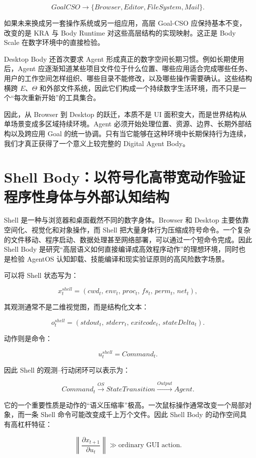 $$
GoalCSO
\rightarrow
\{
Browser,
Editor,
FileSystem,
Mail
\}.
$$

如果未来换成另一套操作系统或另一组应用，高层 Goal-CSO 应保持基本不变，改变的是 KRA 与 Body Runtime 对这些高层结构的实现映射。这正是 Body Scale 在数字环境中的直接检验。

Desktop Body 还首次要求 Agent 形成真正的数字空间长期习惯。例如长期使用后，Agent 应逐渐知道某些项目文件位于什么位置、哪些应用适合完成哪些任务、用户的工作空间怎样组织、哪些目录不能修改，以及哪些操作需要确认。这些结构横跨 $E$、$\Theta$ 和外部文件系统，因此它们构成一个持续数字生活环境，而不只是一个“每次重新开始”的工具集合。

因此，从 Browser 到 Desktop 的跃迁，本质不是 UI 面积变大，而是世界结构从单场景变成多区域持续环境。Agent 必须开始处理位置、资源、边界、长期外部结构以及跨应用 Goal 的统一协调。只有当它能够在这种环境中长期保持行为连续，我们才真正获得了一个意义上较完整的 Digital Agent Body。

\section{Shell Body：以符号化高带宽动作验证程序性身体与外部认知结构}

Shell 是一种与浏览器和桌面截然不同的数字身体。Browser 和 Desktop 主要依靠空间化、视觉化和对象操作，而 Shell 把大量身体行为压缩成符号命令。一个复杂的文件移动、程序启动、数据处理甚至网络部署，可以通过一个短命令完成。因此 Shell Body 是研究“高层语义如何直接编译成高效程序动作”的理想环境，同时也是检验 AgentOS 认知卸载、技能编译和现实验证原则的高风险数字场景。

可以将 Shell 状态写为：

$$
x_t^{shell}
=
(
cwd_t,\,
env_t,\,
proc_t,\,
fs_t,\,
perm_t,\,
net_t
),
$$

其观测通常不是二维视觉图，而是结构化文本：

$$
o_t^{shell}
=
(
stdout_t,\,
stderr_t,\,
exitcode_t,\,
stateDelta_t
).
$$

动作则是命令：

$$
u_t^{shell}
=
Command_t.
$$

因此 Shell 的观测--行动闭环可以表示为：

$$
Command_t
\xrightarrow{OS}
StateTransition
\xrightarrow{Output}
Agent.
$$

它的一个重要性质是动作的“语义压缩率”极高。一次鼠标操作通常改变一个局部对象，而一条 Shell 命令可能改变成千上万个文件。因此 Shell Body 的动作空间具有高杠杆特征：

$$
\left\|
\frac{\partial x_{t+1}}
{\partial u_t}
\right\|
\gg
\text{ordinary GUI action}.
$$

